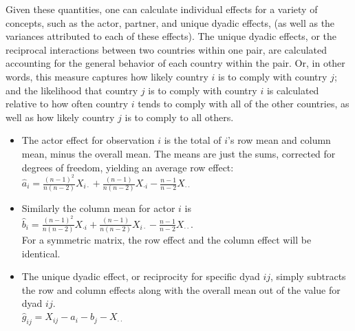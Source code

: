 Given these quantities, one can calculate individual effects for a variety of concepts, such as the actor, partner, and unique dyadic effects, (as well as the variances attributed to each of these effects). The unique dyadic effects, or the reciprocal interactions between two countries within one pair, are calculated accounting for the general behavior of each country within the pair. Or, in other words, this measure captures how likely country $i$ is to comply with country $j$; and the likelihood that country $j$ is to comply with country $i$ is calculated relative to how often country $i$ tends to comply with all of the other countries, as well as how likely country $j$ is to comply to all others. 

 \begin{itemize}
	 \item The actor effect for observation $i$ is the total of $i$'s row mean and column mean, minus the overall mean.  The means are just the sums, corrected for degrees of freedom, yielding an average row effect:\\
	 $\hat{a}_i = \frac{(n-1)^2}{n(n-2)} X_{i \cdot} + \frac{(n-1)}{n(n-2)} X_{\cdot i} -  \frac{n-1}{n-2} X_{\cdot \cdot} $
	\item Similarly the column mean for actor $i$ is \\
	 $\hat{b}_i = \frac{(n-1)^2}{n(n-2)} X_{\cdot i} + \frac{(n-1)}{n(n-2)} X_{i \cdot } -  \frac{n-1}{n-2} X_{\cdot \cdot} $.\\ For a symmetric matrix, the row effect and the column effect will be identical.
	\item The unique dyadic effect, or reciprocity for specific dyad $ij$, simply subtracts the row and column effects along with the overall mean out of the value for dyad $ij$. \\
	$\hat{g}_{ij} = X_{ij} - \hat{a}_i - \hat{b}_j - X_{\cdot \cdot}$
 \end{itemize}

